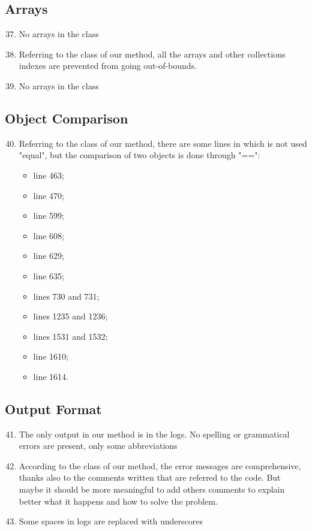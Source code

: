 \subsection{Arrays}
\begin{enumerate}
	\setcounter{enumi}{36}
	\item No arrays in the class
	\item Referring to the class of our method, all the arrays and other collections indexes are prevented from going out-of-bounds.
	\item No arrays in the class
\end{enumerate}
\subsection{Object Comparison}
\begin{enumerate}
	\setcounter{enumi}{39}
	\item Referring to the class of our method, there are some lines in which is not used "equal", but the comparison of two objects is done through "==": 
	    \begin{itemize}
	        \item line 463;
	        \item line 470;
	        \item line 599;
	        \item line 608;
	        \item line 629;
	        \item line 635;
	        \item lines 730 and 731;
	        \item lines 1235 and 1236;
	        \item lines 1531 and 1532;
	        \item line 1610;
	        \item line 1614.
	    \end{itemize}
\end{enumerate}
\subsection{Output Format}
\begin{enumerate}
	\setcounter{enumi}{40}
	\item The only output in our method is in the logs. No spelling or grammatical errors are present, only some abbreviations
	\item According to the class of our method, the error messages are comprehensive, thanks also to the comments written that are referred to the code. But maybe it should be more meaningful to add others comments to explain better what it happens and how to solve the problem.
	\item Some spaces in logs are replaced with underscores
\end{enumerate}
